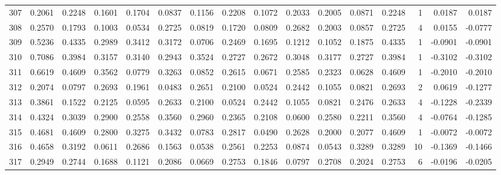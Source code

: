 \begin{tabular}{lrrrrrrrrrrrrrrr}
307 &      0.2061 &  0.2248 &  0.1601 &  0.1704 &  0.0837 &  0.1156 &  0.2208 &  0.1072 &  0.2033 &  0.2005 &   0.0871 &     0.2248 &      1 &                    0.0187 &                     0.0187 \\
308 &      0.2570 &  0.1793 &  0.1003 &  0.0534 &  0.2725 &  0.0819 &  0.1720 &  0.0809 &  0.2682 &  0.2003 &   0.0857 &     0.2725 &      4 &                    0.0155 &                    -0.0777 \\
309 &      0.5236 &  0.4335 &  0.2989 &  0.3412 &  0.3172 &  0.0706 &  0.2469 &  0.1695 &  0.1212 &  0.1052 &   0.1875 &     0.4335 &      1 &                   -0.0901 &                    -0.0901 \\
310 &      0.7086 &  0.3984 &  0.3157 &  0.3140 &  0.2943 &  0.3524 &  0.2727 &  0.2672 &  0.3048 &  0.3177 &   0.2727 &     0.3984 &      1 &                   -0.3102 &                    -0.3102 \\
311 &      0.6619 &  0.4609 &  0.3562 &  0.0779 &  0.3263 &  0.0852 &  0.2615 &  0.0671 &  0.2585 &  0.2323 &   0.0628 &     0.4609 &      1 &                   -0.2010 &                    -0.2010 \\
312 &      0.2074 &  0.0797 &  0.2693 &  0.1961 &  0.0483 &  0.2651 &  0.2100 &  0.0524 &  0.2442 &  0.1055 &   0.0821 &     0.2693 &      2 &                    0.0619 &                    -0.1277 \\
313 &      0.3861 &  0.1522 &  0.2125 &  0.0595 &  0.2633 &  0.2100 &  0.0524 &  0.2442 &  0.1055 &  0.0821 &   0.2476 &     0.2633 &      4 &                   -0.1228 &                    -0.2339 \\
314 &      0.4324 &  0.3039 &  0.2900 &  0.2558 &  0.3560 &  0.2960 &  0.2365 &  0.2108 &  0.0600 &  0.2580 &   0.2211 &     0.3560 &      4 &                   -0.0764 &                    -0.1285 \\
315 &      0.4681 &  0.4609 &  0.2800 &  0.3275 &  0.3432 &  0.0783 &  0.2817 &  0.0490 &  0.2628 &  0.2000 &   0.2077 &     0.4609 &      1 &                   -0.0072 &                    -0.0072 \\
316 &      0.4658 &  0.3192 &  0.0611 &  0.2686 &  0.1563 &  0.0538 &  0.2561 &  0.2253 &  0.0874 &  0.0543 &   0.3289 &     0.3289 &     10 &                   -0.1369 &                    -0.1466 \\
317 &      0.2949 &  0.2744 &  0.1688 &  0.1121 &  0.2086 &  0.0669 &  0.2753 &  0.1846 &  0.0797 &  0.2708 &   0.2024 &     0.2753 &      6 &                   -0.0196 &                    -0.0205 \\

\end{tabular}
